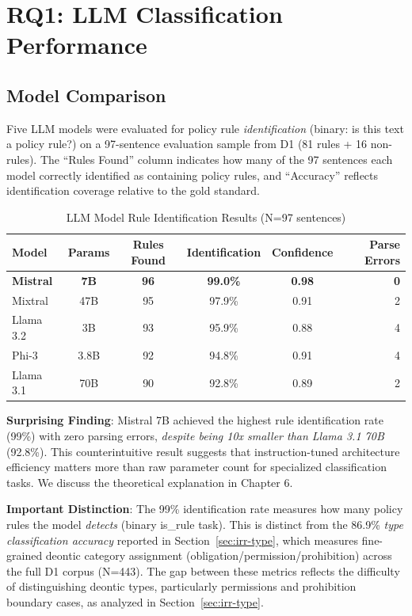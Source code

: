 \section{RQ1: LLM Classification Performance}
\label{sec:model-comparison}

\subsection{Model Comparison}

Five LLM models were evaluated for policy rule \textit{identification} (binary: is this text a policy rule?) on a 97-sentence evaluation sample from D1 (81 rules + 16 non-rules). The ``Rules Found'' column indicates how many of the 97 sentences each model correctly identified as containing policy rules, and ``Accuracy'' reflects identification coverage relative to the gold standard.

\begin{table}[htbp]
\centering
\caption{LLM Model Rule Identification Results (N=97 sentences)}
\label{tab:model-comparison}
\begin{tabular}{lccccr}
\toprule
\textbf{Model} & \textbf{Params} & \textbf{Rules Found} & \textbf{Identification} & \textbf{Confidence} & \textbf{Parse Errors} \\
\midrule
\textbf{Mistral} & \textbf{7B} & \textbf{96} & \textbf{99.0\%} & \textbf{0.98} & \textbf{0} \\
Mixtral & 47B & 95 & 97.9\% & 0.91 & 2 \\
Llama 3.2 & 3B & 93 & 95.9\% & 0.88 & 4 \\
Phi-3 & 3.8B & 92 & 94.8\% & 0.91 & 4 \\
Llama 3.1 & 70B & 90 & 92.8\% & 0.89 & 2 \\
\bottomrule
\end{tabular}
\end{table}

\textbf{Surprising Finding}: Mistral 7B achieved the highest rule identification rate (99\%) with zero parsing errors, \textit{despite being 10x smaller than Llama 3.1 70B} (92.8\%). This counterintuitive result suggests that instruction-tuned architecture efficiency matters more than raw parameter count for specialized classification tasks. We discuss the theoretical explanation in Chapter 6.

\textbf{Important Distinction}: The 99\% identification rate measures how many policy rules the model \textit{detects} (binary is\_rule task). This is distinct from the 86.9\% \textit{type classification accuracy} reported in Section~\ref{sec:irr-type}, which measures fine-grained deontic category assignment (obligation/permission/prohibition) across the full D1 corpus (N=443). The gap between these metrics reflects the difficulty of distinguishing deontic types, particularly permissions and prohibition boundary cases, as analyzed in Section~\ref{sec:irr-type}.

